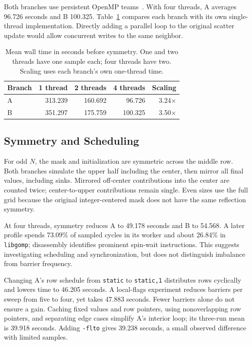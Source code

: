 \documentclass[sigplan,nonacm]{acmart}
\begin{document}
Both branches use persistent OpenMP teams~\cite{openmp}. With four threads, A averages 96.726 seconds and B 100.325. Table~\ref{tab:threads} compares each branch with its own single-thread implementation. Directly adding a parallel loop to the original scatter update would allow concurrent writes to the same neighbor.

\begin{table}[t]
\caption{Mean wall time in seconds before symmetry. One and two threads have one sample each; four threads have two. Scaling uses each branch's own one-thread time.}
\label{tab:threads}
\centering
\setlength{\tabcolsep}{4pt}
\begin{tabular}{lrrrr}
\toprule
Branch & 1 thread & 2 threads & 4 threads & Scaling \\
\midrule
A & 313.239 & 160.692 & 96.726 & 3.24$\times$ \\
B & 351.297 & 175.759 & 100.325 & 3.50$\times$ \\
\bottomrule
\end{tabular}
\end{table}

\subsection{Symmetry and Scheduling}
For odd $N$, the mask and initialization are symmetric across the middle row. Both branches simulate the upper half including the center, then mirror all final values, including sinks. Mirrored off-center contributions into the center are counted twice; center-to-upper contributions remain single. Even sizes use the full grid because the original integer-centered mask does not have the same reflection symmetry.

At four threads, symmetry reduces A to 49.178 seconds and B to 54.568. A later profile spends 73.09\% of sampled cycles in its worker and about 26.84\% in \texttt{libgomp}; disassembly identifies prominent spin-wait instructions. This suggests investigating scheduling and synchronization, but does not distinguish imbalance from barrier frequency.

Changing A's row schedule from \texttt{static} to \texttt{static,1} distributes rows cyclically and lowers time to 46.205 seconds. A local-flags experiment reduces barriers per sweep from five to four, yet takes 47.883 seconds. Fewer barriers alone do not ensure a gain. Caching fixed values and row pointers, using nonoverlapping row pointers, and separating edge cases simplify A's interior loop; its three-run mean is 39.918 seconds. Adding \texttt{-flto} gives 39.238 seconds, a small observed difference with limited samples.
\end{document}
